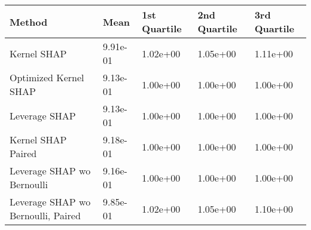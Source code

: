\begin{tabular}{lllll}
  \toprule
  \textbf{Method} & \textbf{Mean} & \textbf{1st Quartile} & \textbf{2nd Quartile} & \textbf{3rd Quartile} \\ \midrule 
Kernel SHAP & 9.91e-01 & 1.02e+00 & 1.05e+00 & 1.11e+00\\
Optimized Kernel SHAP & \cellcolor{gold!60}9.13e-01 & \cellcolor{gold!60}1.00e+00 & \cellcolor{gold!60}1.00e+00 & \cellcolor{gold!60}1.00e+00\\
Leverage SHAP & \cellcolor{gold!60}9.13e-01 & \cellcolor{gold!60}1.00e+00 & \cellcolor{gold!60}1.00e+00 & \cellcolor{gold!60}1.00e+00\\
Kernel SHAP Paired & 9.18e-01 & \cellcolor{gold!60}1.00e+00 & \cellcolor{gold!60}1.00e+00 & \cellcolor{gold!60}1.00e+00\\
Leverage SHAP wo Bernoulli & \cellcolor{bronze!60}9.16e-01 & \cellcolor{gold!60}1.00e+00 & \cellcolor{gold!60}1.00e+00 & \cellcolor{gold!60}1.00e+00\\
Leverage SHAP wo Bernoulli, Paired & 9.85e-01 & 1.02e+00 & 1.05e+00 & 1.10e+00\\
\bottomrule
\end{tabular}